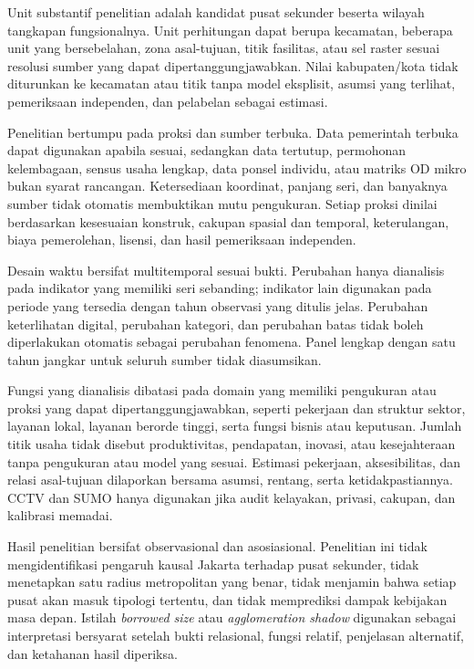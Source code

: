 \documentclass[11pt,a4paper,oneside,openany,indonesian]{report}
\begin{document}
Unit substantif penelitian adalah kandidat pusat sekunder beserta wilayah tangkapan fungsionalnya. Unit perhitungan dapat berupa kecamatan, beberapa unit yang bersebelahan, zona asal-tujuan, titik fasilitas, atau sel raster sesuai resolusi sumber yang dapat dipertanggungjawabkan. Nilai kabupaten/kota tidak diturunkan ke kecamatan atau titik tanpa model eksplisit, asumsi yang terlihat, pemeriksaan independen, dan pelabelan sebagai estimasi.

Penelitian bertumpu pada proksi dan sumber terbuka. Data pemerintah terbuka dapat digunakan apabila sesuai, sedangkan data tertutup, permohonan kelembagaan, sensus usaha lengkap, data ponsel individu, atau matriks OD mikro bukan syarat rancangan. Ketersediaan koordinat, panjang seri, dan banyaknya sumber tidak otomatis membuktikan mutu pengukuran. Setiap proksi dinilai berdasarkan kesesuaian konstruk, cakupan spasial dan temporal, keterulangan, biaya pemerolehan, lisensi, dan hasil pemeriksaan independen.

Desain waktu bersifat multitemporal sesuai bukti. Perubahan hanya dianalisis pada indikator yang memiliki seri sebanding; indikator lain digunakan pada periode yang tersedia dengan tahun observasi yang ditulis jelas. Perubahan keterlihatan digital, perubahan kategori, dan perubahan batas tidak boleh diperlakukan otomatis sebagai perubahan fenomena. Panel lengkap dengan satu tahun jangkar untuk seluruh sumber tidak diasumsikan.

Fungsi yang dianalisis dibatasi pada domain yang memiliki pengukuran atau proksi yang dapat dipertanggungjawabkan, seperti pekerjaan dan struktur sektor, layanan lokal, layanan berorde tinggi, serta fungsi bisnis atau keputusan. Jumlah titik usaha tidak disebut produktivitas, pendapatan, inovasi, atau kesejahteraan tanpa pengukuran atau model yang sesuai. Estimasi pekerjaan, aksesibilitas, dan relasi asal-tujuan dilaporkan bersama asumsi, rentang, serta ketidakpastiannya. CCTV dan SUMO hanya digunakan jika audit kelayakan, privasi, cakupan, dan kalibrasi memadai.

Hasil penelitian bersifat observasional dan asosiasional. Penelitian ini tidak mengidentifikasi pengaruh kausal Jakarta terhadap pusat sekunder, tidak menetapkan satu radius metropolitan yang benar, tidak menjamin bahwa setiap pusat akan masuk tipologi tertentu, dan tidak memprediksi dampak kebijakan masa depan. Istilah \emph{borrowed size} atau \emph{agglomeration shadow} digunakan sebagai interpretasi bersyarat setelah bukti relasional, fungsi relatif, penjelasan alternatif, dan ketahanan hasil diperiksa.
\end{document}
